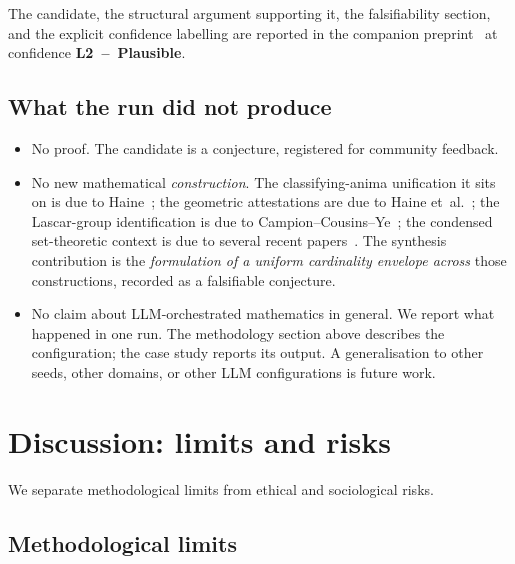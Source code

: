 \documentclass[11pt]{article}
\theoremstyle{definition}
\theoremstyle{remark}
\begin{document}
The candidate, the structural argument supporting it, the falsifiability
section, and the explicit confidence labelling are reported in the
companion preprint~\cite{Vera2026Conjecture} at confidence
\textbf{L2~--~Plausible}.

\subsection{What the run did not produce}

\begin{itemize}
\item No proof. The candidate is a conjecture, registered for
community feedback.
\item No new mathematical \emph{construction}. The classifying-anima
unification it sits on is due to Haine~\cite{Haine2026classifying}; the
geometric attestations are due to Haine
et~al.~\cite{HHLMMW2025}; the Lascar-group identification is due to
Campion--Cousins--Ye~\cite{CampionCousinsYe2021}; the condensed
set-theoretic context is due to several recent
papers~\cite{BLHS2023, BannisterBasak2026, BergfalkLH2024}. The
synthesis contribution is the \emph{formulation of a uniform
cardinality envelope across} those constructions, recorded as a
falsifiable conjecture.
\item No claim about LLM-orchestrated mathematics in general. We
report what happened in one run. The methodology section above
describes the configuration; the case study reports its output. A
generalisation to other seeds, other domains, or other LLM
configurations is future work.
\end{itemize}

\section{Discussion: limits and risks}\label{sec:limits}

We separate methodological limits from ethical and sociological risks.

\subsection{Methodological limits}
\end{document}
